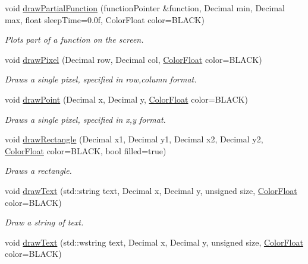 \begin{DoxyCompactItemize}
void \hyperlink{classtsgl_1_1_cartesian_canvas_a8b0d9607230111dd6bef5bf270394b03}{draw\-Partial\-Function} (function\-Pointer \&function, \-Decimal min, \-Decimal max, float sleep\-Time=0.\-0f, Color\-Float color=\-B\-L\-A\-C\-K)
\begin{DoxyCompactList}\small\item\em \-Plots part of a function on the screen. \end{DoxyCompactList}\item 
void \hyperlink{classtsgl_1_1_cartesian_canvas_ad0bdf8651a9f703cfd6f71a6bd6ffe17}{draw\-Pixel} (\-Decimal row, \-Decimal col, \hyperlink{structtsgl_1_1_color_float}{\-Color\-Float} color=\-B\-L\-A\-C\-K)
\begin{DoxyCompactList}\small\item\em \-Draws a single pixel, specified in row,column format. \end{DoxyCompactList}\item 
void \hyperlink{classtsgl_1_1_cartesian_canvas_a2ef932501dd03f885fd0ff30ddffae01}{draw\-Point} (\-Decimal x, \-Decimal y, \hyperlink{structtsgl_1_1_color_float}{\-Color\-Float} color=\-B\-L\-A\-C\-K)
\begin{DoxyCompactList}\small\item\em \-Draws a single pixel, specified in x,y format. \end{DoxyCompactList}\item 
void \hyperlink{classtsgl_1_1_cartesian_canvas_a5e88e7d751e24ae78d158f1d8e9faf5e}{draw\-Rectangle} (\-Decimal x1, \-Decimal y1, \-Decimal x2, \-Decimal y2, \hyperlink{structtsgl_1_1_color_float}{\-Color\-Float} color=\-B\-L\-A\-C\-K, bool filled=true)
\begin{DoxyCompactList}\small\item\em \-Draws a rectangle. \end{DoxyCompactList}\item 
void \hyperlink{classtsgl_1_1_cartesian_canvas_a7df01e80ce99d0ce6b45532034c0940c}{draw\-Text} (std\-::string text, \-Decimal x, \-Decimal y, unsigned size, \hyperlink{structtsgl_1_1_color_float}{\-Color\-Float} color=\-B\-L\-A\-C\-K)
\begin{DoxyCompactList}\small\item\em \-Draw a string of text. \end{DoxyCompactList}\item 
void \hyperlink{classtsgl_1_1_cartesian_canvas_addacb4d3637bf2674e2a992a0c165160}{draw\-Text} (std\-::wstring text, \-Decimal x, \-Decimal y, unsigned size, \hyperlink{structtsgl_1_1_color_float}{\-Color\-Float} color=\-B\-L\-A\-C\-K)

\end{DoxyCompactItemize}
